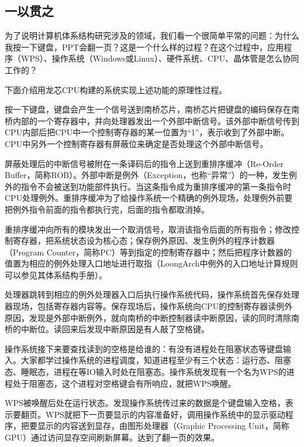 \documentclass[]{ctexbook}
\begin{document}
\hypertarget{ux4e00ux4ee5ux8d2fux4e4b}{%
\subsection{一以贯之}\label{ux4e00ux4ee5ux8d2fux4e4b}}

为了说明计算机体系结构研究涉及的领域，我们看一个很简单平常的问题：为什么我按一下键盘，PPT会翻一页？这是一个什么样的过程？在这个过程中，应用程序（WPS）、操作系统（Windows或Linux）、硬件系统、CPU、晶体管是怎么协同工作的？

下面介绍用龙芯CPU构建的系统实现上述功能的原理性过程。

按一下键盘，键盘会产生一个信号送到南桥芯片，南桥芯片把键盘的编码保存在南桥内部的一个寄存器中，并向处理器发出一个外部中断信号。该外部中断信号传到CPU内部后把CPU中一个控制寄存器的某一位置为``1''，表示收到了外部中断。CPU中另外一个控制寄存器有屏蔽位来确定是否处理这个外部中断信号。

屏蔽处理后的中断信号被附在一条译码后的指令上送到重排序缓冲（Re-Order Buffer，简称ROB）。外部中断是例外（Exception，也称``异常''）的一种，发生例外的指令不会被送到功能部件执行。当这条指令成为重排序缓冲的第一条指令时CPU处理例外。重排序缓冲为了给操作系统一个精确的例外现场，处理例外前要把例外指令前面的指令都执行完，后面的指令都取消掉。

重排序缓冲向所有的模块发出一个取消信号，取消该指令后面的所有指令；修改控制寄存器，把系统状态设为核心态；保存例外原因、发生例外的程序计数器（Program Counter，简称PC）等到指定的控制寄存器中；然后把程序计数器的值置为相应的例外处理入口地址进行取指（LoongArch中例外的入口地址计算规则可以参见其体系结构手册）。

处理器跳转到相应的例外处理器入口后执行操作系统代码，操作系统首先保存处理器现场，包括寄存器内容等。保存现场后，操作系统向CPU的控制寄存器读例外原因，发现是外部中断例外，就向南桥的中断控制器读中断原因，读的同时清除南桥的中断位。读回来后发现中断原因是有人敲了空格键。

操作系统接下来要查找读到的空格是给谁的：有没有进程处在阻塞状态等键盘输入。大家都学过操作系统的进程调度，知道进程至少有三个状态：运行态、阻塞态、睡眠态，进程在等IO输入时处在阻塞态。操作系统发现有一个名为WPS的进程处于阻塞态，这个进程对空格键会有所响应，就把WPS唤醒。

WPS被唤醒后处在运行状态。发现操作系统传过来的数据是个键盘输入空格，表示要翻页。WPS就把下一页要显示的内容准备好，调用操作系统中的显示驱动程序，把要显示的内容送到显存，由图形处理器（Graphic Processing Unit，简称GPU）通过访问显存空间刷新屏幕。达到了翻一页的效果。
\end{document}

